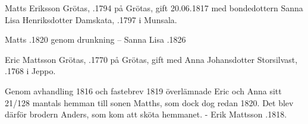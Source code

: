 Matts Eriksson Grötas, .1794 på Grötas, gift 20.06.1817 med bondedottern Sanna Lisa Henriksdotter Damskata, .1797 i Munsala.
\begin{jhchildren}
  \item {}
  \item {}
  \item {}
\end{jhchildren}
Matts .1820 genom drunkning  --  Sanna Lisa .1826


Eric Mattsson Grötas, .1770 på Grötas, gift med Anna Johansdotter Storsilvast, .1768 i Jeppo.
\begin{jhchildren}
  \item {}
  \item {}
  \item {}
  \item {}
  \item {}
  \item {}
  \item {}
  \item {}
  \item {}
  \item {}
  \item {}
  \item {}
  \item {}
\end{jhchildren}
Genom avhandling 1816 och fastebrev 1819 överlämnade Eric och Anna sitt 21/128 mantals hemman till sonen Matths, som dock dog redan 1820. Det blev därför brodern Anders, som kom att sköta hemmanet. - Erik Mattsson .1818.



